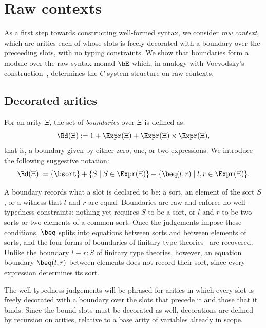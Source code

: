 \section{Raw contexts}

As a first step towards constructing well-formed syntax, we consider \emph{raw context}, which are arities each of whose slots is freely decorated with a boundary over the preceeding slots, with no typing constraints. We show that boundaries form a module over the raw syntax monad $\bE$ which, in analogy with Voevodsky's construction~\cite{Voevodsky2016Relative}, determines the $C$-system structure on raw contexts.

\subsection{Decorated arities}

\begin{definition}\label{def:boundaries}
    For an arity $\Xi$, the set of \emph{boundaries} over $\Xi$ is defined as:
    $$\Bd(\Xi) := 1 + \Expr(\Xi) + \Expr(\Xi) \times \Expr(\Xi),$$
    that is, a boundary given by either zero, one, or two expressions. We introduce the following suggestive notation:
    $$\Bd(\Xi) := \{\bsort\} + \{S \;|\; S \in \Expr(\Xi) \} + \{\beq(l,r) \;|\; l,r\in\Expr(\Xi)\}.$$
\end{definition}

A boundary records what a slot is declared to be: a sort, an element of the sort $S$, or a witness that $l$ and $r$ are equal. Boundaries are raw and enforce no well-typedness constraints: nothing yet requires $S$ to be a sort, or $l$ and $r$ to be two sorts or two elements of a common sort. Once the judgements impose these conditions, $\beq$ splits into equations between sorts and between elements of sorts, and the four forms of boundaries of finitary type theories~\cite{HaselwarterBauer2023} are recovered. Unlike the boundary $l \equiv r : S$ of finitary type theories, however, an equation boundary $\beq(l, r)$ between elements does not record their sort, since every expression determines its sort.

The well-typedness judgements will be phrased for arities in which every slot is freely decorated with a boundary over the slots that precede it and those that it binds. Since the bound slots must be decorated as well, decorations are defined by recursion on arities, relative to a base arity of variables already in scope.

